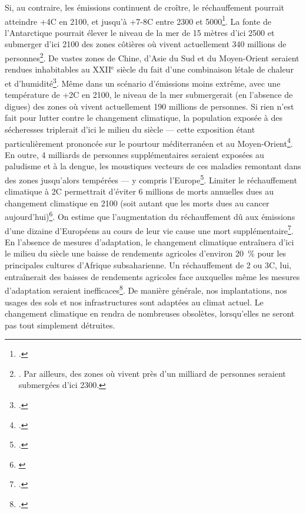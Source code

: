 \documentclass[a5paper,french,openany]{memoir}
\begin{document}
Si, au contraire, les émissions continuent de croître, le réchauffement pourrait atteindre +4\textdegree{}C en 2100, et jusqu'à +7-8\textdegree{}C entre 2300 et 5000\footnote{\citet{montenegro_long_2007}.}. La fonte de l'Antarctique pourrait élever le niveau de la mer de 15 mètres d'ici 2500 et submerger d'ici 2100 des zones côtières où vivent actuellement 340 millions de personnes\footnote{\cite{kulp_new_2019,deconto_contribution_2016,kopp_evolving_2017}. Par ailleurs, des zones où vivent près d'un milliard de personnes seraient submergées d'ici 2300.}. De vastes zones de Chine, d'Asie du Sud et du Moyen-Orient seraient rendues inhabitables au XXII$^\text{e}$ siècle du fait d'une combinaison létale de chaleur et d'humidité\footnote{\citet{pal_future_2016,im_deadly_2017,kang_north_2018}.}. Même dans un scénario d'émissions moins extrême, avec une température de +2\textdegree{}C en 2100, le niveau de la mer submergerait (en l'absence de digues) des zones où vivent actuellement 190 millions de personnes. %
Si rien n'est fait pour lutter contre le changement climatique, la population exposée à des sécheresses triplerait d'ici le milieu du siècle --- cette exposition étant particulièrement prononcée sur le pourtour méditerranéen et au Moyen-Orient\footnote{\cite{elliott_constraints_2014,marzi_assessing_2021}.}. En outre, 4 milliards de personnes supplémentaires seraient exposées au paludisme et à la dengue, les moustiques vecteurs de ces maladies remontant dans des zones jusqu'alors tempérées --- y compris l'Europe\footnote{\cite{colon-gonzalez_projecting_2021}.}. Limiter le réchauffement climatique à 2\textdegree{}C permettrait d'éviter 6 millions de morts annuelles dues au changement climatique en 2100 (soit autant que les morts dues au cancer aujourd'hui)\footnote{\cite{carleton_valuing_2022}}. On estime que l'augmentation du réchauffement dû aux émissions d'une dizaine d'Européens au cours de leur vie cause une mort supplémentaire\footnote{\cite{bressler_mortality_2021}.}. En l'absence de mesures d'adaptation, le changement climatique entraînera d'ici le milieu du siècle une baisse de rendements agricoles d'environ 20~\% pour les principales cultures d'Afrique subsaharienne. Un réchauffement de 2 ou 3\textdegree{}C, lui, entraînerait des baisses de rendements agricoles face auxquelles même les mesures d'adaptation seraient inefficaces\footnote{\cite{schlenker_robust_2010,moore_new_2017}.}. De manière générale, nos implantations, nos usages des sols et nos infrastructures sont adaptées au climat actuel. Le changement climatique en rendra de nombreuses obsolètes, lorsqu'elles ne seront pas tout simplement détruites. 
\end{document}
